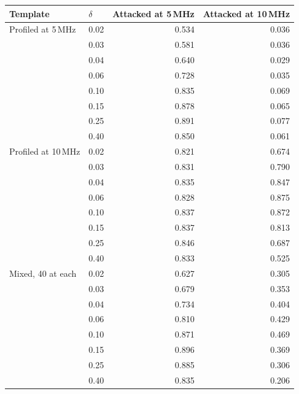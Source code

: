 \begin{tabular}{llrr}
\hline
Template & $\delta$ & Attacked at 5\,MHz & Attacked at 10\,MHz \\
\hline
Profiled at 5\,MHz & 0.02 & 0.534 & 0.036 \\
 & 0.03 & 0.581 & 0.036 \\
 & 0.04 & 0.640 & 0.029 \\
 & 0.06 & 0.728 & 0.035 \\
 & 0.10 & 0.835 & 0.069 \\
 & 0.15 & 0.878 & 0.065 \\
 & 0.25 & 0.891 & 0.077 \\
 & 0.40 & 0.850 & 0.061 \\
\hline
Profiled at 10\,MHz & 0.02 & 0.821 & 0.674 \\
 & 0.03 & 0.831 & 0.790 \\
 & 0.04 & 0.835 & 0.847 \\
 & 0.06 & 0.828 & 0.875 \\
 & 0.10 & 0.837 & 0.872 \\
 & 0.15 & 0.837 & 0.813 \\
 & 0.25 & 0.846 & 0.687 \\
 & 0.40 & 0.833 & 0.525 \\
\hline
Mixed, 40 at each & 0.02 & 0.627 & 0.305 \\
 & 0.03 & 0.679 & 0.353 \\
 & 0.04 & 0.734 & 0.404 \\
 & 0.06 & 0.810 & 0.429 \\
 & 0.10 & 0.871 & 0.469 \\
 & 0.15 & 0.896 & 0.369 \\
 & 0.25 & 0.885 & 0.306 \\
 & 0.40 & 0.835 & 0.206 \\
\hline
\end{tabular}
